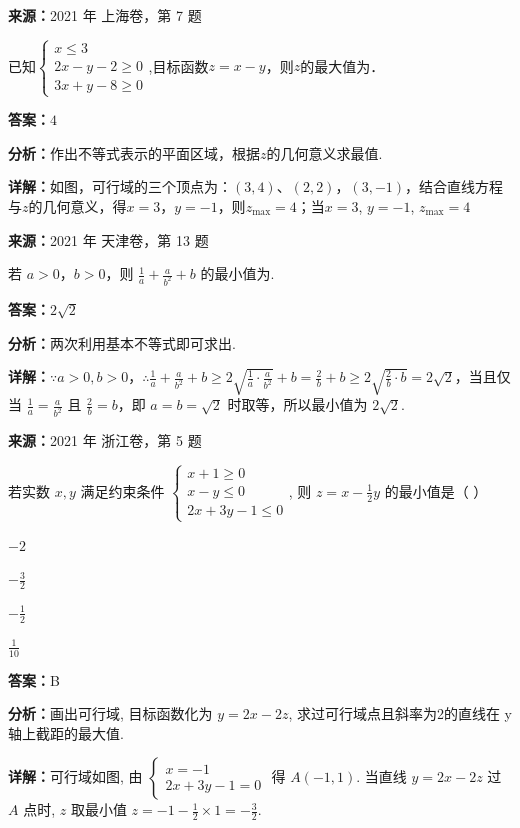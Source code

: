 \begin{question}[points=5]
\textbf{来源：}2021 年 上海卷，第 7 题\par
已知$\begin{cases}x\le 3\\2x-y-2\ge 0\\3x+y-8\ge 0\end{cases}$,目标函数$z=x-y$，则$z$的最大值为．
\fillin[{$4$}]
\begin{solution}
\textbf{答案：}$4$

\textbf{分析：}作出不等式表示的平面区域，根据$z$的几何意义求最值.

\textbf{详解：}如图，可行域的三个顶点为：$(3,4)$、$(2,2)$，$(3,-1)$，结合直线方程与$z$的几何意义，得$x=3$，$y=-1$，则$z_{\max}=4$；当$x=3$, $y=-1$, $z_{\max}=4$
\end{solution}
\end{question}

\begin{question}[points=5]
\textbf{来源：}2021 年 天津卷，第 13 题\par
若 $a > 0$，$b > 0$，则 $\frac{1}{a} + \frac{a}{b^2} + b$ 的最小值为.
\fillin[{$2\sqrt{2}$}]
\begin{solution}
\textbf{答案：}$2\sqrt{2}$

\textbf{分析：}两次利用基本不等式即可求出.

\textbf{详解：}$\because a>0, b>0$，$\therefore \frac{1}{a} + \frac{a}{b^2} + b \ge 2\sqrt{\frac{1}{a} \cdot \frac{a}{b^2}} + b = \frac{2}{b} + b \ge 2\sqrt{\frac{2}{b} \cdot b} = 2\sqrt{2}$，当且仅当 $\frac{1}{a} = \frac{a}{b^2}$ 且 $\frac{2}{b} = b$，即 $a=b=\sqrt{2}$ 时取等，所以最小值为 $2\sqrt{2}$.
\end{solution}
\end{question}

\begin{question}[points=4]
\textbf{来源：}2021 年 浙江卷，第 5 题\par
若实数 $x,y$ 满足约束条件 $\begin{cases} x+1 \geq 0 \\ x-y \leq 0 \\ 2x+3y-1 \leq 0 \end{cases}$, 则 $z = x - \frac{1}{2}y$ 的最小值是（   ）
\begin{choices}
  \item $-2$
  \item $-\frac{3}{2}$
  \item $-\frac{1}{2}$
  \item $\frac{1}{10}$
\end{choices}
\begin{solution}
\textbf{答案：}B

\textbf{分析：}画出可行域, 目标函数化为 $y=2x-2z$, 求过可行域点且斜率为2的直线在 y 轴上截距的最大值.

\textbf{详解：}可行域如图, 由 $\begin{cases} x=-1 \\ 2x+3y-1=0 \end{cases}$ 得 $A(-1,1)$. 当直线 $y=2x-2z$ 过 $A$ 点时, $z$ 取最小值 $z = -1 - \frac{1}{2}\times1 = -\frac{3}{2}$.
\end{solution}
\end{question}

